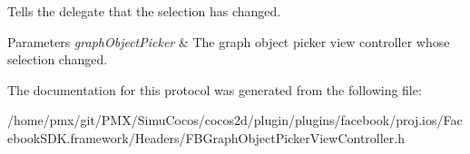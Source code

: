 Tells the delegate that the selection has changed.


\begin{DoxyParams}{Parameters}
{\em graph\+Object\+Picker} & The graph object picker view controller whose selection changed. \\
\hline
\end{DoxyParams}


The documentation for this protocol was generated from the following file\+:\begin{DoxyCompactItemize}
\item 
/home/pmx/git/\+P\+M\+X/\+Simu\+Cocos/cocos2d/plugin/plugins/facebook/proj.\+ios/\+Facebook\+S\+D\+K.\+framework/\+Headers/F\+B\+Graph\+Object\+Picker\+View\+Controller.\+h\end{DoxyCompactItemize}
